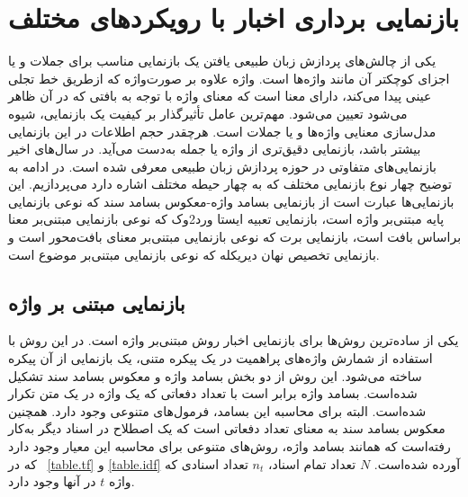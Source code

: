 \section{بازنمایی برداری اخبار با رویکردهای مختلف}
یکی از چالش‌های پردازش زبان طبیعی یافتن یک بازنمایی مناسب برای جملات و یا اجزای کوچکتر آن مانند واژه‌ها است. واژه علاوه بر صورت‌واژه که ازطریق خط تجلی عینی پیدا می‌کند، دارای معنا است که معنای واژه با توجه به بافتی که در آن ظاهر می‌شود تعیین می‌شود. مهم‌ترین عامل تأثیرگذار بر کیفیت یک بازنمایی، شیوه مدل‌سازی معنایی واژه‌ها و یا جملات است. هرچقدر حجم اطلاعات در این بازنمایی بیشتر باشد، بازنمایی دقیق‌تری از واژه یا جمله به‌دست می‌آید. در سال‌های اخیر بازنمایی‌های متفاوتی در حوزه پردازش زبان طبیعی معرفی شده ‌است. در ادامه به توضیح چهار نوع بازنمایی مختلف که به چهار حیطه مختلف اشاره دارد می‌پردازیم. این بازنمایی‌ها عبارت است از بازنمایی بسامد واژه-معکوس بسامد سند که نوعی بازنمایی پایه مبتنی‌بر واژه است، بازنمایی تعبیه ایستا ورد2وک که نوعی بازنمایی مبتنی‌بر معنا براساس بافت است، بازنمایی برت که نوعی بازنمایی مبتنی‌بر معنای بافت‌محور است و بازنمایی تخصیص نهان دیریکله که نوعی بازنمایی مبتنی‌بر موضوع است.

\subsection{بازنمایی مبتنی ‌بر واژه}
یکی از ساده‌ترین روش‌ها برای بازنمایی اخبار روش مبتنی‌بر واژه است. در این روش با استفاده از شمارش واژه‌های پراهمیت در یک پیکره متنی، یک بازنمایی از آن‌ پیکره ساخته می‌شود. این روش از دو بخش بسامد واژه و معکوس بسامد سند تشکیل شده‌است. بسامد واژه برابر است با تعداد دفعاتی که یک واژه در یک متن تکرار شده‌است. البته برای محاسبه این بسامد، فرمول‌های متنوعی وجود دارد. همچنین معکوس بسامد سند به معنای تعداد دفعاتی است که یک اصطلاح در اسناد دیگر به‌کار رفته‌است که همانند بسامد واژه، روش‌های متنوعی برای محاسبه این معیار وجود دارد که در \tablename~\ref{table.tf} و \ref{table.idf} آورده شده‌است. $N$ تعداد تمام اسناد، $n_t$ تعداد اسنادی که واژه $t$ در آنها وجود دارد.

